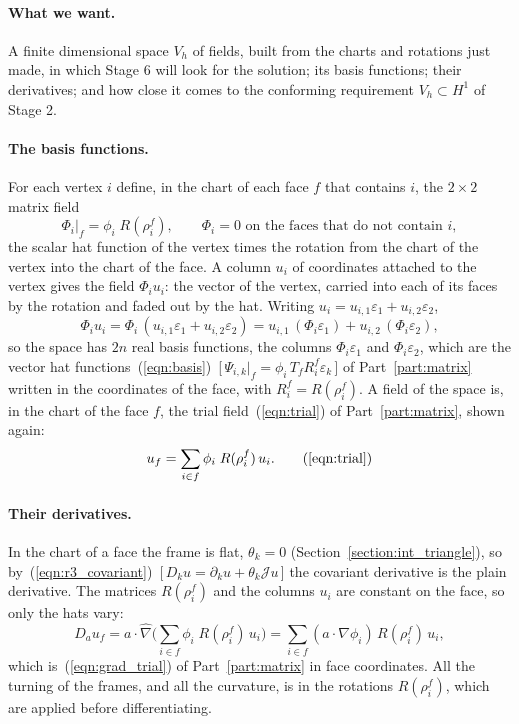 \paragraph{What we want.} A finite dimensional space $V_h$ of fields, built from the charts and rotations just made, in which Stage 6 will look for the solution; its basis functions; their derivatives; and how close it comes to the conforming requirement $V_h \subset H^1$ of Stage 2.

\paragraph{The basis functions.} For each vertex $i$ define, in the chart of each face $f$ that contains $i$, the $2\times 2$ matrix field
\begin{equation}
\label{eqn:r3_basis}
\Phi_i\big|_f = \phi_i\; R(\rho_i^f), \qquad \Phi_i = 0 \text{ on the faces that do not contain } i ,
\end{equation}
the scalar hat function of the vertex times the rotation from the chart of the vertex into the chart of the face. A column $u_i$ of coordinates attached to the vertex gives the field $\Phi_iu_i$: the vector of the vertex, carried into each of its faces by the rotation and faded out by the hat. Writing $u_i = u_{i,1}\varepsilon_1 + u_{i,2}\varepsilon_2$,
\begin{equation*}
\Phi_iu_i = \Phi_i\,(u_{i,1}\varepsilon_1 + u_{i,2}\varepsilon_2) = u_{i,1}\,(\Phi_i\varepsilon_1) + u_{i,2}\,(\Phi_i\varepsilon_2) ,
\end{equation*}
so the space has $2n$ real basis functions, the columns $\Phi_i\varepsilon_1$ and $\Phi_i\varepsilon_2$, which are the vector hat functions~(\ref{eqn:basis})~[\,$\Psi_{i,k}|_f = \phi_i\,T_fR_i^f\varepsilon_k$\,] of Part~\ref{part:matrix} written in the coordinates of the face, with $R_i^f = R(\rho_i^f)$. A field of the space is, in the chart of the face $f$, the trial field~(\ref{eqn:trial}) of Part~\ref{part:matrix}, shown again:
\begin{equation*}
u_f = \sum_{i \in f} \phi_i\; R(\rho_i^f)\, u_i . \tag{\ref{eqn:trial}}
\end{equation*}

\paragraph{Their derivatives.} In the chart of a face the frame is flat, $\theta_k = 0$ (Section~\ref{section:int_triangle}), so by~(\ref{eqn:r3_covariant})~[\,$D_ku = \partial_ku + \theta_k\mathcal Ju$\,] the covariant derivative is the plain derivative. The matrices $R(\rho_i^f)$ and the columns $u_i$ are constant on the face, so only the hats vary:
\begin{equation*}
D_a u_f = a\cdot\hat\nabla\Big(\sum_{i \in f} \phi_i\; R(\rho_i^f)\, u_i\Big) = \sum_{i \in f} (a \cdot \nabla \phi_i)\, R(\rho_i^f)\, u_i ,
\end{equation*}
which is~(\ref{eqn:grad_trial}) of Part~\ref{part:matrix} in face coordinates. All the turning of the frames, and all the curvature, is in the rotations $R(\rho_i^f)$, which are applied before differentiating.

